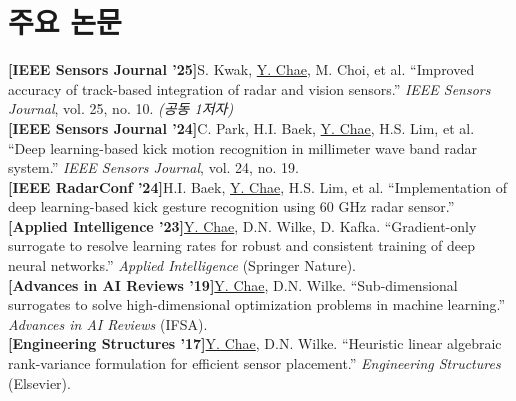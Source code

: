 \documentclass[a4paper,11pt]{article}
\begin{document}
\section{주요 논문}
 \begin{itemize}[leftmargin=0.15in, label={}]
    \small{\item{
      \textbf{[IEEE Sensors Journal '25]}\enspace S. Kwak, \underline{Y. Chae}, M. Choi, et al. ``Improved accuracy of track-based integration of radar and vision sensors.'' \textit{IEEE Sensors Journal}, vol. 25, no. 10. \textit{(공동 1저자)} \\[3pt]
      \textbf{[IEEE Sensors Journal '24]}\enspace C. Park, H.I. Baek, \underline{Y. Chae}, H.S. Lim, et al. ``Deep learning-based kick motion recognition in millimeter wave band radar system.'' \textit{IEEE Sensors Journal}, vol. 24, no. 19. \\[3pt]
      \textbf{[IEEE RadarConf '24]}\enspace H.I. Baek, \underline{Y. Chae}, H.S. Lim, et al. ``Implementation of deep learning-based kick gesture recognition using 60 GHz radar sensor.'' \\[3pt]
      \textbf{[Applied Intelligence '23]}\enspace \underline{Y. Chae}, D.N. Wilke, D. Kafka. ``Gradient-only surrogate to resolve learning rates for robust and consistent training of deep neural networks.'' \textit{Applied Intelligence} (Springer Nature). \\[3pt]
      \textbf{[Advances in AI Reviews '19]}\enspace \underline{Y. Chae}, D.N. Wilke. ``Sub-dimensional surrogates to solve high-dimensional optimization problems in machine learning.'' \textit{Advances in AI Reviews} (IFSA). \\[3pt]
      \textbf{[Engineering Structures '17]}\enspace \underline{Y. Chae}, D.N. Wilke. ``Heuristic linear algebraic rank-variance formulation for efficient sensor placement.'' \textit{Engineering Structures} (Elsevier).
    }}
 \end{itemize}

\end{document}
